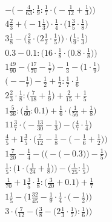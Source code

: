\documentclass[8pt]{article}
\begin{document}
\begin{align}
-\Big(-\frac{4}{63} : \frac{1}{9} : \frac{1}{7} \cdot \big(-\frac{1}{12} + \frac{1}{3}\big)\Big) \\
4\frac{2}{3} + \big(-1\frac{1}{3}\big) \cdot \frac{1}{4} \cdot \big(1\frac{3}{5} \cdot \frac{1}{8}\big) \\
3\frac{1}{8} - \Big(\frac{2}{8} \cdot \big(2\frac{1}{2} \cdot \frac{1}{5}\big)\Big) \cdot \Big(\frac{1}{9} : \frac{1}{3}\Big) \\
0.3 - 0.1 : \Big(16 \cdot \frac{1}{8} \cdot \big(0.8 \cdot \frac{1}{8}\big)\Big) \\
1\frac{49}{90} - \big(\frac{17}{70} - \frac{1}{7}\big) - \frac{1}{3} - \big(1 \cdot \frac{1}{9}\big) \\
\big(--\frac{1}{7}\big) - \frac{1}{2} + \frac{1}{2} : \frac{1}{7} \cdot \frac{1}{6} \\
2\frac{2}{3} \cdot \frac{1}{8} : \big(\frac{7}{18} + \frac{1}{9}\big) + \frac{2}{15} + \frac{1}{5} \\
1\frac{5}{36} : \big(\frac{1}{60} : 0.1\big) + \frac{1}{6} \cdot \big(\frac{1}{56} + \frac{1}{8}\big) \\
11\frac{3}{7} \cdot \big(-\frac{13}{30} - \frac{1}{3}\big) - \big(\frac{4}{7} \cdot \frac{1}{4}\big) \\
\frac{4}{5} + 1\frac{3}{5} \cdot \Big(\frac{7}{12} - \frac{1}{8} - \big(-\frac{1}{6} + \frac{1}{2}\big)\Big) \\
1\frac{7}{20} - \frac{1}{4} - \bigg(\Big(-\big(-0.3\big)\Big) - \frac{1}{5}\bigg) \\
\frac{1}{5} : \Big(1 \cdot \big(\frac{1}{24} + \frac{1}{8}\big)\Big) - \Big(\frac{1}{25} : \frac{1}{5}\Big) \\
\frac{1}{70} + 1\frac{3}{5} \cdot \frac{1}{8} : \big(\frac{3}{20} + 0.1\big) + \frac{1}{7} \\
1\frac{1}{5} - \Big(1\frac{32}{45} - \frac{1}{9} \cdot \frac{1}{4} \cdot \big(-\frac{1}{2}\big)\Big) \\
3 \cdot \bigg(\frac{7}{12} - \Big(\frac{3}{8} - \big(2\frac{1}{3} \cdot \frac{1}{7}\big) : \frac{1}{6}\Big)\bigg)
\end{align}
\end{document}
